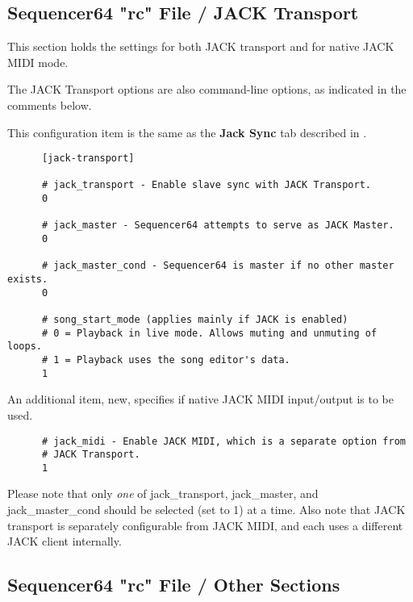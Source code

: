 \subsection{Sequencer64 "rc" File / JACK Transport}
\label{subsec:seq64_rc_file_jack_transport}

   This section holds the settings for both JACK transport and for native JACK
   MIDI mode.

   The JACK Transport options are also command-line options, as indicated in
   the comments below.

   This configuration item is the same as the 
   \textbf{Jack Sync} tab described in
   .

   \begin{verbatim}
      [jack-transport]

      # jack_transport - Enable slave sync with JACK Transport.
      0

      # jack_master - Sequencer64 attempts to serve as JACK Master.
      0

      # jack_master_cond - Sequencer64 is master if no other master exists.
      0

      # song_start_mode (applies mainly if JACK is enabled)
      # 0 = Playback in live mode. Allows muting and unmuting of loops.
      # 1 = Playback uses the song editor's data.
      1
   \end{verbatim}

   An additional item, new, specifies if native JACK MIDI input/output is to be
   used.

   \begin{verbatim}
      # jack_midi - Enable JACK MIDI, which is a separate option from
      # JACK Transport.
      1
   \end{verbatim}

   Please note that only \textsl{one} of
   jack\_transport, jack\_master, and jack\_master\_cond should be selected
   (set to 1) at a time.
   Also note that JACK transport is separately configurable from
   JACK MIDI, and each uses a different JACK client internally.

\subsection{Sequencer64 "rc" File / Other Sections}
\label{subsec:seq64_rc_file_other_midi}

